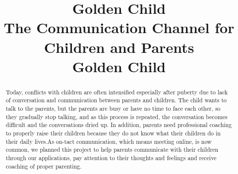 \documentclass[conference]{IEEEtran}
\begin{document}
\title{Golden Child \\
  {\LARGE The Communication Channel for Children and Parents} \\
  {\footnotesize \large Golden Child}
   }

\author{
\and
{}
\and
{}
\and
{}
}

\maketitle

\begin{abstract}
  Today, conflicts with children are often intensified especially after puberty due to lack of conversation and communication between parents and children. The child wants to talk to the parents, but the parents are busy or have no time to face each other, so they gradually stop talking, and as this process is repeated, the conversation becomes difficult and the conversations dried up. In addition, parents need professional coaching to properly raise their children because they do not know what their children do in their daily lives.As on-tact communication, which means meeting online, is now common, we planned this project to help parents communicate with their children through our applications, pay attention to their thoughts and feelings and receive coaching of proper parenting.\\
\end{abstract}
\end{document}
